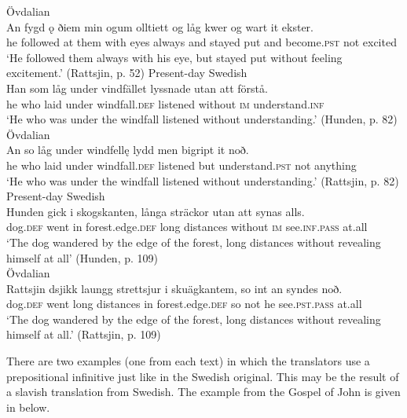 \documentclass[output=paper]{langscibook}
\begin{document}
\ex Övdalian\label{ex:kalm:23b}\\ 
\gll An fygd ǫ ðiem min ogum olltiett og låg kwer og wart it ekster.\\
he followed at them with eyes always and stayed put and become.\textsc{pst} not excited\\
\glt ‘He followed them always with his eye, but stayed put without feeling excitement.’ (Rattsjin, p. 52)
\z 
\ex
\label{ex:kalm:24}
\ea Present-day Swedish\label{ex:kalm:24a}\\
\gll Han som låg under vindfället lyssnade utan att förstå.\\
he who laid under windfall.\textsc{def} listened without \textsc{im} understand.\textsc{inf}\\
\glt ‘He who was under the windfall listened without understanding.’ (Hunden, p. 82)\\
\ex Övdalian\label{ex:kalm:24b}\\ 
\gll An so låg under windfellę lydd men bigript it noð.\\
he who laid under windfall.\textsc{def} listened but understand.\textsc{pst} not anything\\
\glt ‘He who was under the windfall listened without understanding.’ (Rattsjin, p. 82)
\z
\ex
\label{ex:kalm:25}
\ea Present-day Swedish\label{ex:kalm:25a}\\
\gll Hunden gick i skogskanten, långa sträckor utan att synas alls.\\
dog.\textsc{def} went in forest.edge.\textsc{def} long distances without \textsc{im} see.\textsc{inf.pass} at.all\\
\glt ‘The dog wandered by the edge of the forest, long distances without revealing himself at all’ (Hunden, p. 109)\\
\ex Övdalian\label{ex:kalm:25b}\\ 
\gll Rattsjin dsjikk laungg strettsjur i skuägkantem, so int an syndes noð.\\
dog.\textsc{def} went long distances in forest.edge.\textsc{def} so not he see.\textsc{pst.pass} at.all\\
\glt ‘The dog wandered by the edge of the forest, long distances without revealing himself at all.’ (Rattsjin, p. 109)
\z 
\z 


There are two examples (one from each text) in which the translators use a prepositional infinitive just like in the Swedish original. This may be the result of a slavish translation from Swedish. The example from the Gospel of John is given in  below.\pagebreak
\end{document}
